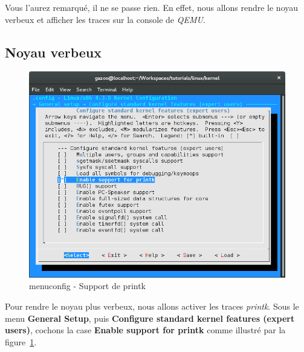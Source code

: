 \documentclass[a4paper]{article}
\begin{document}
Vous l'aurez remarqué, il ne se passe rien. En effet, nous allons rendre le noyau verbeux et afficher les traces sur la console de \textit{QEMU}.

\subsection{Noyau verbeux}

\begin{figure}
\label{menuconfig_enable_printk}
\includegraphics[scale=0.5]{menuconfig-enable-printk.png}
\caption{menuconfig - Support de printk}
\end{figure}

Pour rendre le noyau plus verbeux, nous allons activer les traces \textit{printk}. Sous le menu \textbf{General Setup}, puis \textbf{Configure standard kernel features (expert users)}, cochons la case \textbf{Enable support for printk} comme illustré par la figure~\ref{menuconfig_enable_printk}.\\
\end{document}
